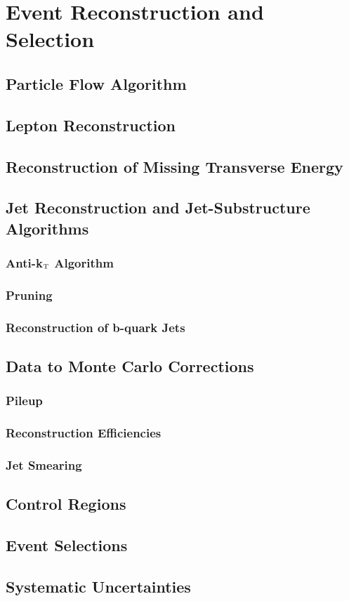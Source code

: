 \chapter{Event Reconstruction and Selection}
\label{chap::EventReconstructionandSelection}

\section{Particle Flow Algorithm}
\section{Lepton Reconstruction}
\section{Reconstruction of Missing Transverse Energy}
\section{Jet Reconstruction and Jet-Substructure Algorithms}
\subsection{Anti-k$_{\rm T}$ Algorithm}
\subsection{Pruning}
\subsection{Reconstruction of b-quark Jets}
\section{Data to Monte Carlo Corrections}
\subsection{Pileup}
\subsection{Reconstruction Efficiencies}
\subsection{Jet Smearing}
\section{Control Regions}
\section{Event Selections}
\section{Systematic Uncertainties}